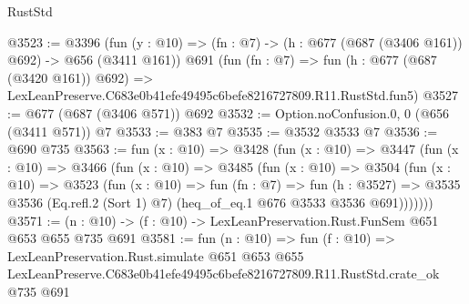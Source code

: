 \begin{lexlean}{RustStd}
\begin{coremodule}
@3523 := @3396
    (fun (y : @10) => (fn : @7) -> (h : @677 (@687 (@3406 @161)) @692) -> @656 (@3411 @161))
    @691
    (fun (fn : @7) =>
    fun (h : @677 (@687 (@3420 @161)) @692) =>
    LexLeanPreserve.C683e0b41efe49495c6befe8216727809.R11.RustStd.fun5)
@3527 := @677 (@687 (@3406 @571)) @692
@3532 := Option.noConfusion.{0, 0} (@656 (@3411 @571)) @7
@3533 := @383 @7
@3535 := @3532 @3533 @7
@3536 := @690 @735
@3563 := fun (x : @10) =>
  @3428
    (fun (x : @10) =>
    @3447
      (fun (x : @10) =>
      @3466
        (fun (x : @10) =>
        @3485
          (fun (x : @10) =>
          @3504
            (fun (x : @10) =>
            @3523
              (fun (x : @10) =>
              fun (fn : @7) =>
              fun (h : @3527) =>
              @3535 @3536 (Eq.refl.{2} (Sort 1) @7) (heq_of_eq.{1} @676 @3533 @3536 @691)))))))
@3571 := (n : @10) -> (f : @10) -> LexLeanPreservation.Rust.FunSem @651 @653 @655 @735 @691
@3581 := fun (n : @10) =>
  fun (f : @10) =>
  LexLeanPreservation.Rust.simulate
    @651
    @653
    @655
    LexLeanPreserve.C683e0b41efe49495c6befe8216727809.R11.RustStd.crate_ok
    @735
    @691
\end{coremodule}
\end{lexlean}

